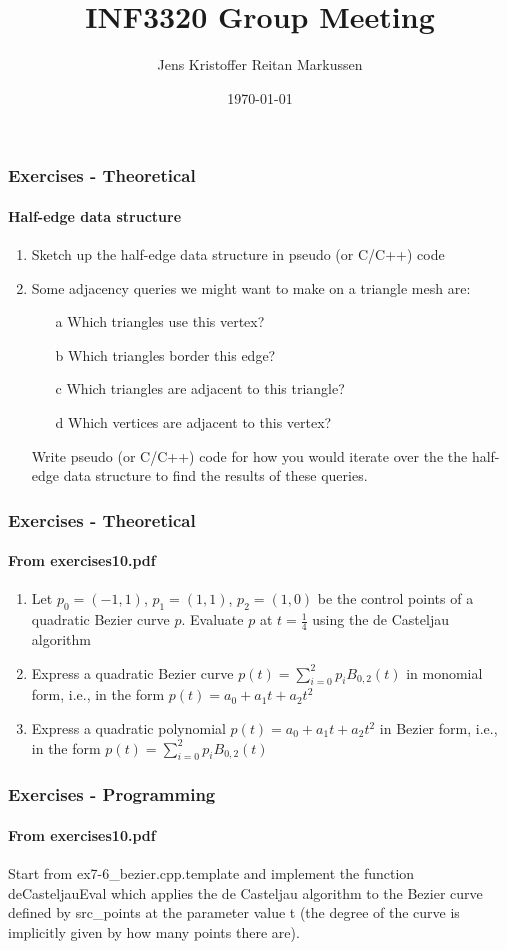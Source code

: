 \documentclass[11pt]{beamer}
\title{INF3320 Group Meeting}
\author{Jens Kristoffer Reitan Markussen}
\date{\today}
\begin{document}
	\begin{frame}
	\frametitle{Exercises - Theoretical}
	\framesubtitle{Half-edge data structure}
	\begin{enumerate}
	\item Sketch up the half-edge data structure in pseudo (or C/C++) code 
	\item Some adjacency queries we might want to make on a triangle mesh are:
		\begin{enumerate}
		\item[a] Which triangles use this vertex?
		\item[b]	 Which triangles border this edge?
		\item[c]	 Which triangles are adjacent to this triangle?
		\item[d] Which vertices are adjacent to this vertex?
		\end{enumerate}	 
		Write pseudo (or C/C++) code for how you would iterate over the the half-edge data structure to find the results of these queries.	
		
	\end{enumerate}
	\end{frame}

	\begin{frame}
	\frametitle{Exercises - Theoretical}
	\framesubtitle{From exercises10.pdf}
	\begin{enumerate}
	\item  Let $p_0=(-1,1)$, $p_1=(1,1)$, $p_2=(1,0)$ be the control points of a quadratic Bezier curve $p$. Evaluate $p$ at $t=\frac{1}{4}$ using the de Casteljau algorithm

	\item Express a quadratic Bezier curve $p(t)=\sum^2_{i=0}p_iB_{0,2}(t)$ in monomial form, i.e., in the form $p(t)=a_0+a_1t+a_2t^2$
	
	\item Express a quadratic polynomial $p(t)=a_0+a_1t+a_2t^2$ in Bezier form, i.e., in the form $p(t)=\sum^2_{i=0}p_iB_{0,2}(t)$
	\end{enumerate}
	\end{frame}
	
	\begin{frame}
	\frametitle{Exercises - Programming}
	\framesubtitle{From exercises10.pdf}
	\begin{center}
	 Start from
ex7-6\_bezier.cpp.template
and implement the function
deCasteljauEval
which applies the de Casteljau algorithm to the Bezier curve defined
by
src\_points
at the parameter value
t
(the degree of the curve is implicitly given by
how many points there are).
	\end{center}
	\end{frame}
\end{document}
